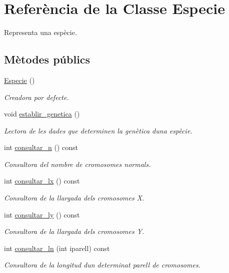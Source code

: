 \hypertarget{class_especie}{}\section{Referència de la Classe Especie}
\label{class_especie}


Representa una espècie.  


\subsection*{Mètodes públics}
\begin{DoxyCompactItemize}
\item 
\hyperlink{class_especie_a272c2488719cc9874b2f174906675b3d}{Especie} ()
\begin{DoxyCompactList}\small\item\em Creadora por defecte. \end{DoxyCompactList}\item 
void \hyperlink{class_especie_a5c424f7536e2e5fcb7e7e5452ab24ff7}{establir\+\_\+genetica} ()
\begin{DoxyCompactList}\small\item\em Lectora de les dades que determinen la genètica d\textquotesingle{}una espècie. \end{DoxyCompactList}\item 
int \hyperlink{class_especie_ab8a394dfdea959e383645ae90d0086ca}{consultar\+\_\+n} () const 
\begin{DoxyCompactList}\small\item\em Consultora del nombre de cromosomes normals. \end{DoxyCompactList}\item 
int \hyperlink{class_especie_a35b595c9f7dcf3e23b9c85278f72322e}{consultar\+\_\+lx} () const 
\begin{DoxyCompactList}\small\item\em Consultora de la llargada dels cromosomes X. \end{DoxyCompactList}\item 
int \hyperlink{class_especie_afba7e27b8516600f74ff683b90e9fa40}{consultar\+\_\+ly} () const 
\begin{DoxyCompactList}\small\item\em Consultora de la llargada dels cromosomes Y. \end{DoxyCompactList}\item 
int \hyperlink{class_especie_aaa23d14e7e07335ff033d31e89e359ec}{consultar\+\_\+ln} (int iparell) const 
\begin{DoxyCompactList}\small\item\em Consultora de la longitud d\textquotesingle{}un determinat parell de cromosomes. \end{DoxyCompactList}\end{DoxyCompactItemize}
